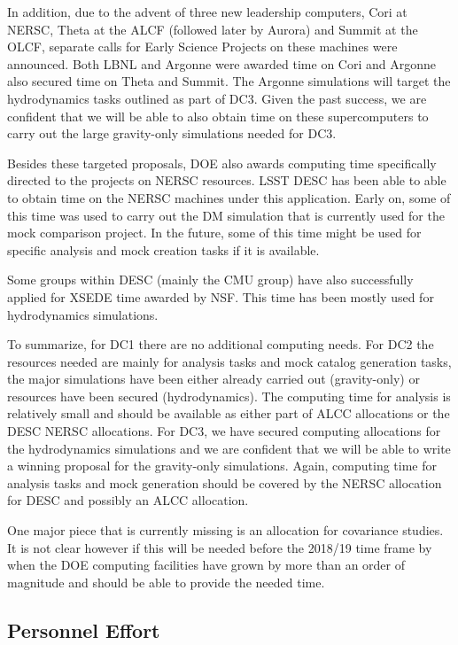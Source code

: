In addition, due to the advent of three new leadership computers, Cori at NERSC, Theta at the ALCF (followed later by Aurora) and Summit at the OLCF, separate calls for Early Science Projects on these machines were announced. Both LBNL and Argonne were awarded time on Cori and Argonne also secured time on Theta and Summit. The Argonne simulations will target the hydrodynamics tasks outlined as part of DC3. Given the past success, we are confident that we will be able to also obtain time on these supercomputers to carry out the large gravity-only simulations needed for DC3.

Besides these targeted proposals, DOE also awards computing time specifically directed to the projects on NERSC resources. LSST DESC has been able to able to obtain time on the NERSC machines under this application. Early on, some of this time was used to carry out the DM simulation that is currently used for the mock comparison project. In the future, some of this time might be used for specific analysis and mock creation tasks if it is available.

Some groups within DESC (mainly the CMU group) have also successfully applied for XSEDE time awarded by NSF. This time has been mostly used for hydrodynamics simulations. 

To summarize, for DC1 there are no additional computing needs. For DC2 the resources needed are mainly for analysis tasks and mock catalog generation tasks, the major simulations have been either already carried out (gravity-only) or resources have been secured (hydrodynamics). The computing time for analysis is relatively small and should be available as either part of ALCC allocations or the DESC NERSC allocations. For DC3, we have secured computing allocations for the hydrodynamics simulations and we are confident that we will be able to write a winning proposal for the gravity-only simulations. Again, computing time for analysis tasks and mock generation should be covered by the NERSC allocation for DESC and possibly an ALCC allocation.

One major piece that is currently missing is an allocation for covariance studies. It is not clear however if this will be needed before the 2018/19 time frame by when the DOE computing facilities have grown by more than an order of magnitude and should be able to provide the needed time.

\subsection{Personnel Effort}

